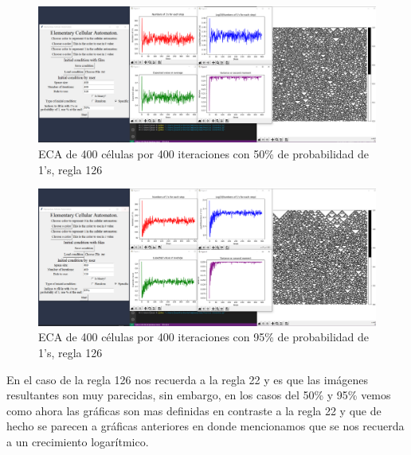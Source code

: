 \documentclass[11pt]{article}
\begin{document}
		\begin{figure}[H]
			\centering
			\includegraphics[scale=0.26]{resources/add17.png}
			\caption{ECA de 400 células por 400 iteraciones con 50\% de probabilidad de 1's, regla 126}								\label{fig:picture}
		\end{figure}
		\begin{figure}[H]
			\centering
			\includegraphics[scale=0.26]{resources/add18.png}
			\caption{ECA de 400 células por 400 iteraciones con 95\% de probabilidad de 1's, regla 126}								\label{fig:picture}
		\end{figure}
		En el caso de la regla 126 nos recuerda a la regla 22 y es que las imágenes resultantes son muy parecidas, sin embargo, en los casos del 50\% y 95\% vemos como ahora las gráficas son mas definidas en contraste a la regla 22 y que de hecho se parecen a gráficas anteriores en donde mencionamos que se nos recuerda a un crecimiento logarítmico.
\end{document}
